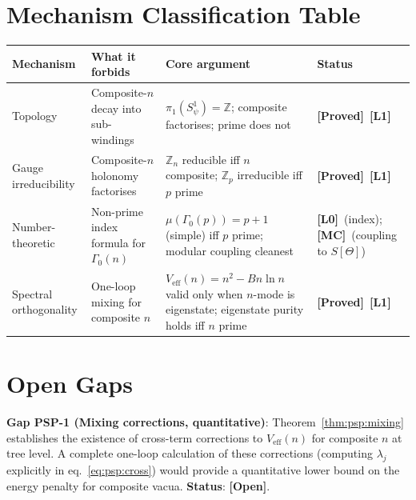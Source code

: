 \documentclass[12pt,a4paper]{article}
\theoremstyle{definition}
\theoremstyle{remark}
\newcommand{\ZZ}{\mathbb{Z}}
\newcommand{\PROVED}{\textbf{[Proved]}}
\newcommand{\OPEN}{\textbf{[Open]}}
\newcommand{\MC}{\textbf{[MC]}}
\newcommand{\Lone}{\textbf{[L1]}}
\newcommand{\Lzero}{\textbf{[L0]}}
\begin{document}
\section{Mechanism Classification Table}
\label{sec:psp:table}

\begin{center}
\renewcommand{\arraystretch}{1.45}
\begin{tabular}{p{3.2cm} p{3.5cm} p{4cm} p{2.5cm}}
\toprule
\textbf{Mechanism} & \textbf{What it forbids} & \textbf{Core argument} & \textbf{Status} \\
\midrule
Topology
  & Composite-$n$ decay into sub-windings
  & $\pi_1(S^1_\psi) = \ZZ$; composite factorises; prime does not
  & \PROVED\ \Lone \\
Gauge irreducibility
  & Composite-$n$ holonomy factorises
  & $\ZZ_n$ reducible iff $n$ composite; $\ZZ_p$ irreducible iff $p$ prime
  & \PROVED\ \Lone \\
Number-theoretic
  & Non-prime index formula for $\Gamma_0(n)$
  & $\mu(\Gamma_0(p)) = p+1$ (simple) iff $p$ prime; modular coupling cleanest
  & \Lzero\ (index); \MC\ (coupling to $S[\Theta]$) \\
Spectral orthogonality
  & One-loop mixing for composite $n$
  & $V_{\mathrm{eff}}(n) = n^2 - Bn\ln n$ valid only when $n$-mode is eigenstate;
    eigenstate purity holds iff $n$ prime
  & \PROVED\ \Lone \\
\bottomrule
\end{tabular}
\end{center}

\section{Open Gaps}
\label{sec:psp:gaps}

\begin{gapbox}
\textbf{Gap PSP-1 (Mixing corrections, quantitative)}:
Theorem~\ref{thm:psp:mixing} establishes the existence of cross-term corrections
to $V_{\mathrm{eff}}(n)$ for composite $n$ at tree level.  A complete
one-loop calculation of these corrections (computing $\lambda_j$ explicitly in
eq.~\eqref{eq:psp:cross}) would provide a quantitative lower bound on the energy
penalty for composite vacua.  \textbf{Status}: \OPEN.
\end{gapbox}
\end{document}
